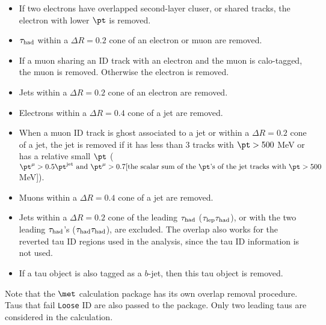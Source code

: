 \begin{itemize}
\item If two electrons have overlapped second-layer cluser, or shared tracks, the electron with lower $\pt$ is removed.
\item $\tau_\text{had}$ within a $\Delta R=0.2$ cone of an electron or muon are removed.
\item If a muon sharing an ID track with an electron and the muon is calo-tagged, the muon is removed. Otherwise the electron is removed.
\item Jets within a $\Delta R=0.2$ cone of an electron are removed.
\item Electrons within a $\Delta R=0.4$ cone of a jet are removed.
\item When a muon ID track is ghost associated to a jet or within a $\Delta R=0.2$ cone of a jet, the jet is removed if it has less than 3 tracks with $\pt>500$ MeV or has a relative small $\pt$ ($\pt^{\mu}>0.5\pt^{\text{jet}} \text{ and } \pt^{\mu}>0.7[\text{the scalar sum of the } \pt \text{'s of the jet tracks with } \pt>500$ MeV]).
\item Muons within a $\Delta R=0.4$ cone of a jet are removed.
\item Jets within a $\Delta R=0.2$ cone of the leading $\tau_\text{had}$ ($\tau_\text{lep}{}\tau_\text{had}$), or with the two leading $\tau_\text{had}$'s ($\tau_\text{had}{}\tau_\text{had}$), are excluded. The overlap also works for the reverted tau ID regions used in the analysis, since the tau ID information is not used.
\item If a tau object is also tagged as a $b$-jet, then this tau object is removed.
\end{itemize}

Note that the $\met$ calculation package has its own overlap removal procedure. Taus that fail \texttt{Loose} ID are also passed to the package. Only two leading taus are considered in the calculation.
